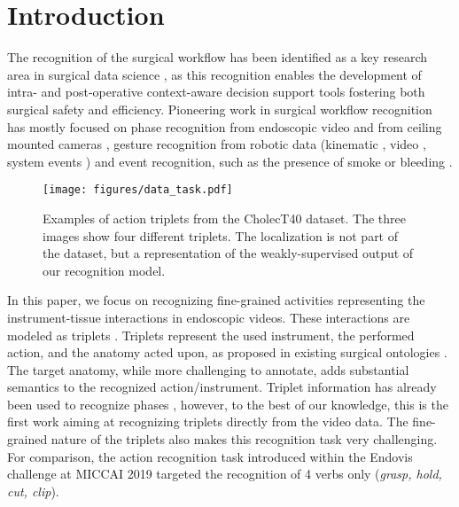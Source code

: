 \documentclass[english,runningheads,a4paper]{llncs}
\begin{document}
 \section{Introduction}
The recognition of the surgical workflow has been identified as a key research area in surgical data science \cite{maier2017surgical}, as this recognition enables the development of intra- and post-operative context-aware decision support tools fostering both surgical safety and efficiency. 
Pioneering work in surgical workflow recognition has mostly focused on phase recognition from endoscopic video \cite{phase_lo2003episode,phase_blum2010modeling,phase_dergachyova2016automatic,twinanda_endonet_ieee2017,phase_zisimopoulos2018deepphase,phase_funke2018temporal} and from ceiling mounted cameras \cite{twinanda2015data,chakraborty2013video}, gesture recognition from robotic data (kinematic \cite{dipietro_recognizing_miccai2016,dipietro_segmenting_ijcars2019}, video \cite{zia_surgical_miccai2018,kitaguchi_real_sr2019}, system events \cite{malpani2016system}) and event recognition, such as the presence of smoke or bleeding \cite{loukas2015smoke}. 

\begin{figure}[tb]
\texttt{[image: figures/data\_task.pdf]} 
\caption{Examples of action triplets from the CholecT40 dataset. The three images show four different triplets. The localization is not part of the dataset, but a representation of the weakly-supervised output of our recognition model.}
\label{fig:task_and_data}
\end{figure}

In this paper, we focus on recognizing fine-grained activities representing the instrument-tissue interactions in endoscopic videos. These interactions are modeled as triplets . Triplets represent the used instrument, the performed action, and the anatomy acted upon, as proposed in existing surgical ontologies  \cite{neumuth_acquisition_icdesa2006,katic_lapontospm_ijcars2015}. The target anatomy, while more challenging to annotate, adds substantial semantics to the recognized action/instrument. Triplet information has already been used to recognize phases \cite{katic_lapontospm_ijcars2015}, however, to the best of our knowledge, this is the first work aiming at recognizing triplets directly from the video data. The fine-grained nature of the triplets also makes this recognition task very challenging. For comparison, the action recognition task introduced within the Endovis challenge at MICCAI 2019 targeted the recognition of 4 verbs only (\textit{grasp, hold, cut, clip}).
\end{document}
